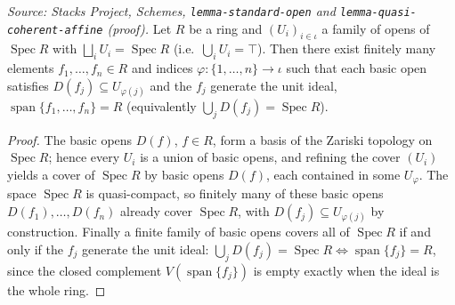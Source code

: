 \begin{lemma}\leanok
  \label{lem:exists_finite_basicOpen_subcover}
  \textit{Source: Stacks Project, Schemes, \texttt{lemma-standard-open} and
  \texttt{lemma-quasi-coherent-affine} (proof).}
  Let \(R\) be a ring and \((U_i)_{i \in \iota}\) a family of opens of
  \(\operatorname{Spec} R\) with \(\bigsqcup_i U_i = \operatorname{Spec} R\) (i.e.\
  \(\bigcup_i U_i = \top\)). Then there exist finitely many elements
  \(f_1, \ldots, f_n \in R\) and indices \(\varphi : \{1, \ldots, n\} \to \iota\) such
  that each basic open satisfies \(D(f_j) \subseteq U_{\varphi(j)}\) and the \(f_j\)
  generate the unit ideal, \(\operatorname{span}\{f_1, \ldots, f_n\} = R\) (equivalently
  \(\bigcup_j D(f_j) = \operatorname{Spec} R\)).
\end{lemma}
\begin{proof}

\leanok
  The basic opens \(D(f)\), \(f \in R\), form a basis of the Zariski topology on
  \(\operatorname{Spec} R\); hence every \(U_i\) is a union of basic opens, and refining
  the cover \((U_i)\) yields a cover of \(\operatorname{Spec} R\) by basic opens
  \(D(f)\), each contained in some \(U_{\varphi}\). The space \(\operatorname{Spec} R\)
  is quasi-compact, so finitely many of these basic opens \(D(f_1), \ldots, D(f_n)\)
  already cover \(\operatorname{Spec} R\), with \(D(f_j) \subseteq U_{\varphi(j)}\) by
  construction. Finally a finite family of basic opens covers all of
  \(\operatorname{Spec} R\) if and only if the \(f_j\) generate the unit ideal:
  \(\bigcup_j D(f_j) = \operatorname{Spec} R \iff \operatorname{span}\{f_j\} = R\), since
  the closed complement \(V(\operatorname{span}\{f_j\})\) is empty exactly when the ideal
  is the whole ring.
\end{proof}

